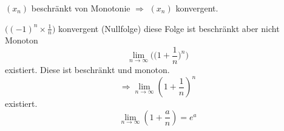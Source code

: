 $(x_n)$ beschränkt von Monotonie $\Rightarrow$ $(x_n)$ konvergent.

\begin{example} %
	
	$\Big((-1)^n \times\frac{1}{n} \Big)$ konvergent (Nullfolge) diese Folge ist beschränkt aber nicht Monoton 
	$$ \lim_{n \to \infty}{\Big( \big(1 + \frac{1}{n}\big)^n \Big)} $$  existiert. Diese ist beschränkt und monoton. \\
	$$\Rightarrow \lim_{n \to \infty}{(1+\frac{1}{n})^n}$$ 
	existiert. 
	$$\lim_{n \to \infty}{(1+\frac{a}{n})=e^a}$$
\end{example}
\newpage
